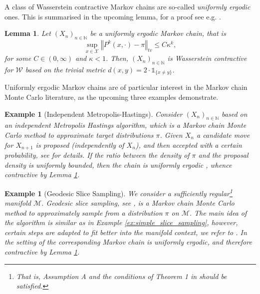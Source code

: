 \documentclass[12pt]{article}
\theoremstyle{plain}
\newtheorem{lem}[thm]{Lemma}
\newtheorem{example}[thm]{Example}
\newcommand{\norm}[1]{\left\Vert #1 \right\Vert}
\newcommand{\N}{\mathbb{N}}
\newcommand{\cX}{\mathcal{X}}
\begin{document}
A class of Wasserstein contractive Markov chains are so-called \textit{uniformly ergodic} ones. This is summarised in the upcoming lemma, for a proof see e.g. \cite[Remark 2.1]{rudolf2018pertubation}.
\begin{lem}\label{lem:uniformly_ergodic_implies_contraction}
Let $(X_n)_{n \in \N}$ be a uniformly ergodic Markov chain, that is 
\[
\sup_{x \in \cX}\norm{P^k(x,\cdot) -\pi}_{tv} \leq C \kappa^k,
\]
for some $C\in (0, \infty)$ and $\kappa<1$. Then, $(X_n)_{n \in \N}$ is Wasserstein contractive for $\mathcal{W}$ based on the trivial metric $d (x,y) = 2\cdot\mathds{1}_{\{x \neq y\}}$.
\end{lem}
Uniformly ergodic Markov chains are of particular interest in the Markov chain Monte Carlo literature, as the upcoming three examples demonstrate. 

\begin{example}[Independent Metropolis-Hastings]\label{example:independent_Metropolis_Hastings}
Consider $(X_n)_{n \in \N}$ based on an {independent Metropolis Hastings} algorithm, which is a Markov chain Monte Carlo method to approximate target distributions $\pi$. 
Given $X_n$ a candidate move for $X_{n+1}$ is proposed (independently of $X_n$), and then accepted with a certain probability, see \cite[Algorithm 1]{wang2022exact} for details. 
If the ratio between the density of $\pi$ and the proposal density is uniformly bounded, then the chain is uniformly ergodic \cite{wang2022exact}, whence contractive by Lemma \ref{lem:uniformly_ergodic_implies_contraction}.
\end{example}

\begin{example}[Geodesic Slice Sampling]
We consider a sufficiently regular\footnote{That is, Assumption A and the conditions of Theorem 1 in \cite{hasenpflug2025uniform} should be satisfied.} manifold $\mathscr{M}$. Geodesic slice sampling, see \cite{durmus2025geodesicslicesamplingriemannian}, is a  Markov chain Monte Carlo method to approximately sample from a distribution $\pi$ on $\mathscr{M}$. 
The main idea of the algorithm is similar as in Example \ref{ex:simple_slice_sampling}, however, certain steps are adapted to fit better into the manifold context, we refer to \cite{durmus2025geodesicslicesamplingriemannian}. 
In the setting of \cite[Theorem 1]{hasenpflug2025uniform} the corresponding Markov chain is uniformly ergodic, and therefore contractive by Lemma \ref{lem:uniformly_ergodic_implies_contraction}.
\end{example}
\end{document}
